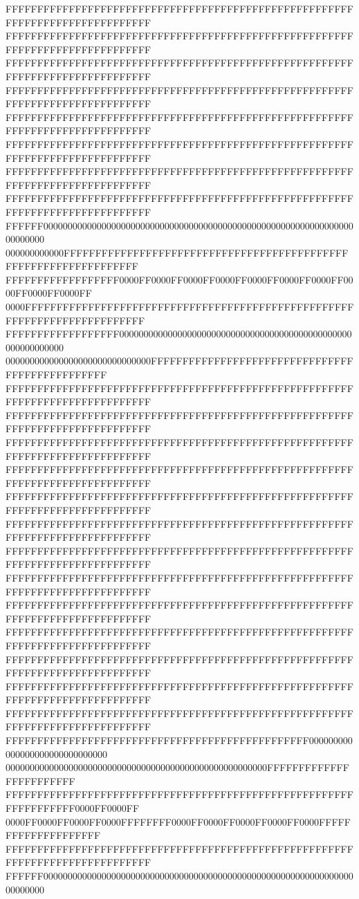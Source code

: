 FFFFFFFFFFFFFFFFFFFFFFFFFFFFFFFFFFFFFFFFFFFFFFFFFFFFFFFFFFFFFFFFFFFFFFFFFFFFFF
FFFFFFFFFFFFFFFFFFFFFFFFFFFFFFFFFFFFFFFFFFFFFFFFFFFFFFFFFFFFFFFFFFFFFFFFFFFFFF
FFFFFFFFFFFFFFFFFFFFFFFFFFFFFFFFFFFFFFFFFFFFFFFFFFFFFFFFFFFFFFFFFFFFFFFFFFFFFF
FFFFFFFFFFFFFFFFFFFFFFFFFFFFFFFFFFFFFFFFFFFFFFFFFFFFFFFFFFFFFFFFFFFFFFFFFFFFFF
FFFFFFFFFFFFFFFFFFFFFFFFFFFFFFFFFFFFFFFFFFFFFFFFFFFFFFFFFFFFFFFFFFFFFFFFFFFFFF
FFFFFFFFFFFFFFFFFFFFFFFFFFFFFFFFFFFFFFFFFFFFFFFFFFFFFFFFFFFFFFFFFFFFFFFFFFFFFF
FFFFFFFFFFFFFFFFFFFFFFFFFFFFFFFFFFFFFFFFFFFFFFFFFFFFFFFFFFFFFFFFFFFFFFFFFFFFFF
FFFFFFFFFFFFFFFFFFFFFFFFFFFFFFFFFFFFFFFFFFFFFFFFFFFFFFFFFFFFFFFFFFFFFFFFFFFFFF
FFFFFF000000000000000000000000000000000000000000000000000000000000000000000000
000000000000FFFFFFFFFFFFFFFFFFFFFFFFFFFFFFFFFFFFFFFFFFFFFFFFFFFFFFFFFFFFFFFFFF
FFFFFFFFFFFFFFFFFF0000FF0000FF0000FF0000FF0000FF0000FF0000FF0000FF0000FF0000FF
0000FFFFFFFFFFFFFFFFFFFFFFFFFFFFFFFFFFFFFFFFFFFFFFFFFFFFFFFFFFFFFFFFFFFFFFFFFF
FFFFFFFFFFFFFFFFFF000000000000000000000000000000000000000000000000000000000000
000000000000000000000000000000FFFFFFFFFFFFFFFFFFFFFFFFFFFFFFFFFFFFFFFFFFFFFFFF
FFFFFFFFFFFFFFFFFFFFFFFFFFFFFFFFFFFFFFFFFFFFFFFFFFFFFFFFFFFFFFFFFFFFFFFFFFFFFF
FFFFFFFFFFFFFFFFFFFFFFFFFFFFFFFFFFFFFFFFFFFFFFFFFFFFFFFFFFFFFFFFFFFFFFFFFFFFFF
FFFFFFFFFFFFFFFFFFFFFFFFFFFFFFFFFFFFFFFFFFFFFFFFFFFFFFFFFFFFFFFFFFFFFFFFFFFFFF
FFFFFFFFFFFFFFFFFFFFFFFFFFFFFFFFFFFFFFFFFFFFFFFFFFFFFFFFFFFFFFFFFFFFFFFFFFFFFF
FFFFFFFFFFFFFFFFFFFFFFFFFFFFFFFFFFFFFFFFFFFFFFFFFFFFFFFFFFFFFFFFFFFFFFFFFFFFFF
FFFFFFFFFFFFFFFFFFFFFFFFFFFFFFFFFFFFFFFFFFFFFFFFFFFFFFFFFFFFFFFFFFFFFFFFFFFFFF
FFFFFFFFFFFFFFFFFFFFFFFFFFFFFFFFFFFFFFFFFFFFFFFFFFFFFFFFFFFFFFFFFFFFFFFFFFFFFF
FFFFFFFFFFFFFFFFFFFFFFFFFFFFFFFFFFFFFFFFFFFFFFFFFFFFFFFFFFFFFFFFFFFFFFFFFFFFFF
FFFFFFFFFFFFFFFFFFFFFFFFFFFFFFFFFFFFFFFFFFFFFFFFFFFFFFFFFFFFFFFFFFFFFFFFFFFFFF
FFFFFFFFFFFFFFFFFFFFFFFFFFFFFFFFFFFFFFFFFFFFFFFFFFFFFFFFFFFFFFFFFFFFFFFFFFFFFF
FFFFFFFFFFFFFFFFFFFFFFFFFFFFFFFFFFFFFFFFFFFFFFFFFFFFFFFFFFFFFFFFFFFFFFFFFFFFFF
FFFFFFFFFFFFFFFFFFFFFFFFFFFFFFFFFFFFFFFFFFFFFFFFFFFFFFFFFFFFFFFFFFFFFFFFFFFFFF
FFFFFFFFFFFFFFFFFFFFFFFFFFFFFFFFFFFFFFFFFFFFFFFFFFFFFFFFFFFFFFFFFFFFFFFFFFFFFF
FFFFFFFFFFFFFFFFFFFFFFFFFFFFFFFFFFFFFFFFFFFFFFFF000000000000000000000000000000
000000000000000000000000000000000000000000000000000000FFFFFFFFFFFFFFFFFFFFFFFF
FFFFFFFFFFFFFFFFFFFFFFFFFFFFFFFFFFFFFFFFFFFFFFFFFFFFFFFFFFFFFFFFFF0000FF0000FF
0000FF0000FF0000FF0000FFFFFFFF0000FF0000FF0000FF0000FF0000FFFFFFFFFFFFFFFFFFFF
FFFFFFFFFFFFFFFFFFFFFFFFFFFFFFFFFFFFFFFFFFFFFFFFFFFFFFFFFFFFFFFFFFFFFFFFFFFFFF
FFFFFF000000000000000000000000000000000000000000000000000000000000000000000000
